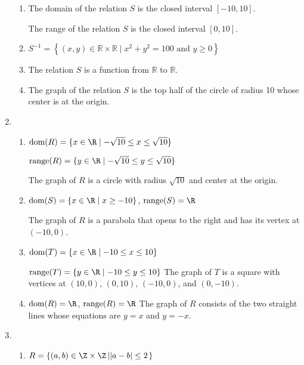 \begin{enumerate}
\begin{enumerate}
\item The domain of the relation $S$ is the closed interval $\left[ -10, 10 \right]$.

The range of the relation $S$ is the closed interval $\left[ 0, 10 \right]$.

\item $S^{-1} = \left\{ {\left( {x, y} \right) \in \mathbb{R} \times \mathbb{R} \mid x^2  + y^2  = 100} \text{ and } y \geq 0 \right\}$

\item The relation $S$ is a function from $\mathbb{R}$ to $\mathbb{R}$.

\item The graph of the relation $S$ is the top half of the circle of radius 10 whose center is at the origin.
\end{enumerate}


\item \begin{enumerate}
\item $\text{dom}(R) = \{ x \in \R \mid -\sqrt{10} \leq x \leq \sqrt{10} \}$

$\text{range}(R) = \{ y \in \R \mid -\sqrt{10} \leq y \leq \sqrt{10} \}$

The graph of $R$ is a circle with radius $\sqrt{10}$ and center at the origin.

\item $\text{dom}(S) = \{ x \in \R \mid x \geq -10 \}$, 
$\text{range}(S) = \R$

The graph of $R$ is a parabola that opens to the right and has its vertex at $(-10, 0)$.

\item $\text{dom}(T) = \{ x \in \R \mid -10 \leq x \leq 10 \}$

$\text{range}(T) = \{ y \in \R \mid -10 \leq y \leq 10 \}$ \quad 
The graph of $T$ is a square with vertices at $(10, 0)$, $(0, 10)$, $(-10, 0)$, and $(0, -10)$. 

\item $\text{dom}(R) = \R$, $\text{range}(R) = \R$ \quad 
The graph of $R$ consists of the two straight lines whose equations are $y = x$ and $y = -x$.
\end{enumerate}


\item \begin{enumerate}
\item $R = \left\{ (a, b) \in \Z \times \Z \left| \left| a - b \right| \leq 2 \right. \right\}$


\end{enumerate}
\end{enumerate}
